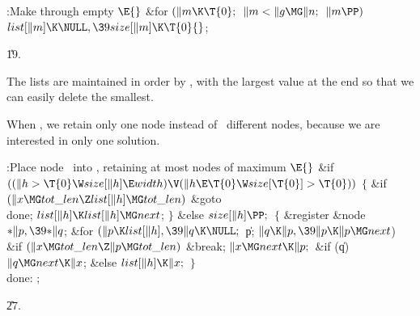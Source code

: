 \B{}:Make  through  empty%
\X${}\E{}$\6
\&{for} ${}(\|m\K\T{0};{}$ ${}\|m<\|g\MG\|n;{}$ ${}\|m\PP){}$\1\5
${}\\{list}[\|m]\K\NULL,\39\\{size}[\|m]\K\T{0}{}$;\2\par
\U19.\fi

The lists are maintained in order by , with the largest
 value at the end so that we can easily delete the smallest.

When , we retain only one node instead of~
different nodes,
because we are interested in only one solution.

\Y\B\4:Place node~ into , retaining at most  nodes of maximum \X${}\E{}$\6
\&{if} ${}((\|h>\T{0}\W\\{size}[\|h]\E\\{width})\V(\|h\E\T{0}\W\\{size}[\T{0}]>%
\T{0})){}$\5
${}\{{}$\1\6
\&{if} ${}(\|x\MG\\{tot\_len}\Z\\{list}[\|h]\MG\\{tot\_len}){}$\1\5
\&{goto} \\{done};\2\6
${}\\{list}[\|h]\K\\{list}[\|h]\MG\\{next}{}$;\6
\4${}\}{}$\5
\2\&{else}\1\5
${}\\{size}[\|h]\PP;{}$\2\6
${}\{{}$\5
\1\&{register} \&{node} ${}{*}\|p,\39{*}\|q{}$;\7
\&{for} ${}(\|p\K\\{list}[\|h],\39\|q\K\NULL;{}$ \|p; ${}\|q\K\|p,\39\|p\K\|p%
\MG\\{next}{}$)\5
\1\&{if} ${}(\|x\MG\\{tot\_len}\Z\|p\MG\\{tot\_len}){}$\1\5
\&{break};\2\2\6
${}\|x\MG\\{next}\K\|p;{}$\6
\&{if} (\|q)\1\5
${}\|q\MG\\{next}\K\|x{}$;\5
\2\&{else}\1\5
${}\\{list}[\|h]\K\|x;{}$\2\6
\4${}\}{}$\2\6
\4\\{done}:\5
;\par
\U27.\fi

